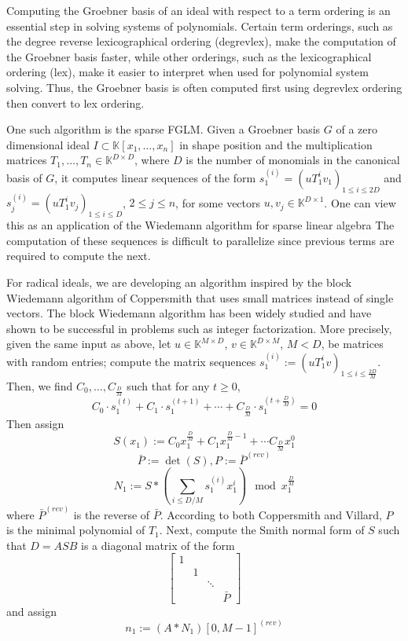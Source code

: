 \documentclass[12pt]{article}
\begin{document}
Computing the Groebner basis of an ideal with respect to a term ordering 
is an essential step in solving systems of polynomials.
Certain term orderings, such as the degree reverse lexicographical ordering (degrevlex),
make the computation of the Groebner basis faster, while other orderings, 
such as the lexicographical ordering (lex), make it easier to interpret when
used for polynomial system solving. Thus, the Groebner basis is often computed
first using degrevlex ordering then convert to lex ordering.

One such algorithm is the sparse FGLM. Given a Groebner basis $G$ of a zero 
dimensional ideal $I \subset \mathbb{K}[x_1, \dots, x_n]$ 
in shape position and the multiplication matrices $T_1,\dots, T_n \in \mathbb{K}^{D \times D}$,
where $D$ is the number of monomials in the canonical basis of $G$, it computes 
linear sequences of the form $s_1^{(i)} = (uT_1^iv_1)_{1\le i \le 2D}$ and
$s_j^{(i)} = (uT_1^iv_j)_{1\le i \le D}$, $2 \le j \le n$, for some vectors $u,v_j \in 
\mathbb{K}^{D\times 1}$. One can view this as an application of the Wiedemann algorithm 
for sparse linear algebra The computation of these sequences is difficult to parallelize 
since previous terms are required to compute the next. 

For radical ideals, we are developing an algorithm inspired by the block Wiedemann algorithm of Coppersmith
that uses small matrices instead of single vectors. The block Wiedemann algorithm has been 
widely studied and have shown to be successful in problems such as integer factorization.
More precisely, given the same input as above, let $u \in \mathbb{K}^{M \times D}$, $v \in \mathbb{K}^{D \times M}$, $M < D$, be 
matrices with random entries; compute the matrix sequences $s_1^{(i)} := (uT_1^iv)_{1\le i \le \frac{2D}{M}}$. 
Then, we find $C_0, \dots, C_\frac{D}{M}$ such that for any $t \ge 0$,
$$ C_0 \cdot s_1^{(t)} + C_1 \cdot s_1^{(t+1)} + \cdots + C_{\frac{D}{M}} \cdot s_1^{(t+\frac{D}{M})}  = 0$$
Then assign
$$ S(x_1) := C_0  x_1^{\frac{D}{M}} + C_1  x_1^{\frac{D}{M} - 1} + \cdots C_{\frac{D}{M}} x_1^0$$
$$ \bar{P} := \det(S) , P := \bar{P}^{(rev)}$$
$$ N_1 := S * (\sum_{i\le D/M} s_1^{(i)} x_1^i) \mod x_1^{\frac{D}{M}}$$
where $\bar{P}^{(rev)}$ is the reverse of $\bar{P}$. According to both Coppersmith and Villard,
$P$ is the minimal polynomial of $T_1$. Next, compute the Smith normal form 
of $S$ such that $D = A S B$ is a diagonal matrix of the form
$$\begin{bmatrix}
	1 &  &        & \\
	  & 1&        &  \\ 
	  &  & \ddots & \\
	  &  &        & \bar{P}
\end{bmatrix}$$
and assign
$$ n_1 := (A*N_1)[0,M-1]^{(rev)}$$
\end{document}
